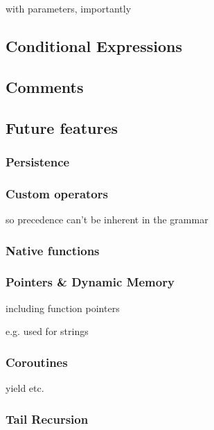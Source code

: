             with parameters, importantly
        
        \subsection{Conditional Expressions}
        
        \subsection{Comments}
        
        \subsection{Future features}
            
            \subsubsection{Persistence}
                
            \subsubsection{Custom operators}
                
                so precedence can't be inherent in the grammar
                
            \subsubsection{Native functions}
                
            \subsubsection{Pointers \& Dynamic Memory}
                
                including function pointers
                
                e.g. used for strings
                
            \subsubsection{Coroutines}
            	
            	yield etc.
            
            \subsubsection{Tail Recursion}
            
